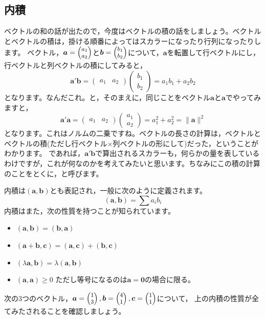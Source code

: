 \documentclass{ltjsbook}
\begin{document}
\subsection{内積}
ベクトルの和の話が出たので，今度はベクトルの積の話をしましょう。ベクトルとベクトルの積は，掛ける順番によってはスカラーになったり行列になったりします。
ベクトル，$\bm{a} = \footnotesize\begin{pmatrix}a_1 \\ a_2 \end{pmatrix}$と$\bm{b} = \footnotesize\begin{pmatrix}b_1 \\ b_2 \end{pmatrix}$について，$\bm{a}$を転置して行ベクトルにし，行ベクトルと列ベクトルの積にしてみると，
\[ \bm{a}'\bm{b} = \begin{pmatrix}a_1 & a_2 \end{pmatrix} \begin{pmatrix} b_1\\b_2\end{pmatrix} = a_1b_1 + a_2b_2\]
となります。なんだこれ。と，そのまえに，同じことをベクトル$\bm{a}$と$\bm{a}$でやってみますと，
\[ \bm{a}'\bm{a} = \begin{pmatrix}a_1 & a_2 \end{pmatrix} \begin{pmatrix} a_1\\a_2\end{pmatrix} = a_1^2 + a_2^2 = \|\bm{a}\|^2 \]
となります。これはノルムの二乗ですね。ベクトルの長さの計算は，ベクトルとベクトルの積(ただし行ベクトル$\times$列ベクトルの形にして)だった，ということがわかります。
であれば，$\bm{a}'\bm{b}$で算出されるスカラーも，何らかの量を表しているわけですが，これが何なのかを考えてみたいと思います。ちなみにこの積の計算のことをとくに，と呼びます。

内積は$(\bm{a},\bm{b})$とも表記され，一般に次のように定義されます。
\[ (\bm{a},\bm{b}) = \sum a_i b_i \]
内積はまた，次の性質を持つことが知られています。
\begin{itemize}
	\item $(\bm{a},\bm{b}) = (\bm{b}, \bm{a}) $
	\item $(\bm{a}+\bm{b}, \bm{c}) = (\bm{a},\bm{c}) + (\bm{b},\bm{c}) $
	\item $(\lambda\bm{a},\bm{b}) = \lambda(\bm{a},\bm{b})$
	\item $(\bm{a},\bm{a}) \ge 0$\; ただし等号になるのは$\bm{a} = \bm{0}$の場合に限る。
\end{itemize}
\begin{reidai}{}{}
	次の3つのベクトル，$\bm{a} = \footnotesize\begin{pmatrix}1\\3\end{pmatrix},\bm{b}=\footnotesize\begin{pmatrix}4\\1\end{pmatrix},\bm{c}=\footnotesize\begin{pmatrix}1\\1\end{pmatrix}$について，
	上の内積の性質が全てみたされることを確認しましょう。
\end{reidai}
\end{document}

